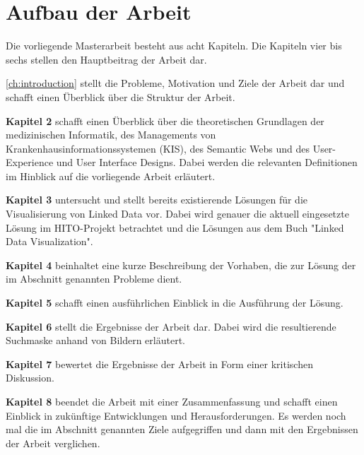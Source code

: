 \section{Aufbau der Arbeit}\label{sec:aufbau}

Die vorliegende Masterarbeit besteht aus acht Kapiteln. Die Kapiteln vier bis sechs stellen den Hauptbeitrag der Arbeit dar. \newline

\cref{ch:introduction} stellt die Probleme, Motivation und Ziele der Arbeit dar und schafft einen Überblick über die Struktur der Arbeit. \newline

\textbf{Kapitel 2} schafft einen Überblick über die theoretischen Grundlagen der medizinischen Informatik, des Managements von Krankenhausinformationssystemen (KIS), des Semantic Webs und des User-Experience und User Interface Designs. Dabei werden die relevanten Definitionen im Hinblick auf die vorliegende Arbeit erläutert.  \newline

\textbf{Kapitel 3} untersucht und stellt bereits existierende Lösungen für die Visualisierung von Linked Data vor. Dabei wird genauer die aktuell eingesetzte Lösung im HITO-Projekt betrachtet und die Lösungen aus dem Buch "Linked Data Visualization". \newline

\textbf{Kapitel 4} beinhaltet eine kurze Beschreibung der Vorhaben, die zur Lösung der im Abschnitt  genannten Probleme dient. \newline

\textbf{Kapitel 5} schafft einen ausführlichen Einblick in die Ausführung der Lösung.  \newline

\textbf{Kapitel 6} stellt die Ergebnisse der Arbeit dar. Dabei wird die resultierende Suchmaske anhand von Bildern erläutert. \newline

\textbf{Kapitel 7} bewertet die Ergebnisse der Arbeit in Form einer kritischen Diskussion. \newline

\textbf{Kapitel 8} beendet die Arbeit mit einer Zusammenfassung und schafft einen Einblick in zukünftige Entwicklungen und Herausforderungen. Es werden noch mal die im Abschnitt  genannten Ziele aufgegriffen und dann mit den Ergebnissen der Arbeit verglichen.



